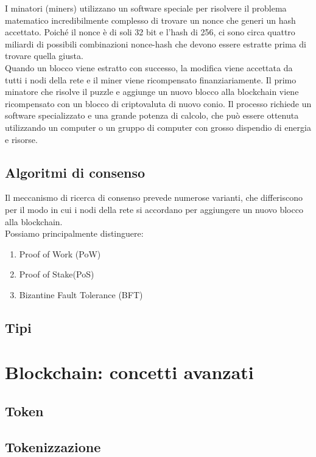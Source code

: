 I minatori (miners) utilizzano un software speciale per risolvere il problema matematico incredibilmente complesso 
di trovare un nonce che generi un hash accettato. Poiché il nonce è di soli 32 bit e l'hash di 256, ci sono circa quattro miliardi 
di possibili combinazioni nonce-hash che devono essere estratte prima di trovare quella giusta. \\

Quando un blocco viene estratto con successo, la modifica viene accettata da tutti i nodi della rete e il miner viene ricompensato finanziariamente. 
Il primo minatore che risolve il puzzle e aggiunge un nuovo blocco alla blockchain viene ricompensato con un blocco di criptovaluta di nuovo conio.
Il processo richiede un software specializzato e una grande potenza di calcolo, che può essere ottenuta utilizzando un computer o un gruppo di computer con grosso dispendio di energia e risorse.

\subsection{Algoritmi di consenso}\label{sec:tecnologie-blockchain-algoritmi}
Il meccanismo di ricerca di consenso prevede numerose varianti, che differiscono per il modo in cui i nodi della rete si accordano per aggiungere un nuovo blocco alla blockchain.\\
Possiamo principalmente distinguere:
\begin{enumerate}
    \item{Proof of Work (PoW)}
    \item{Proof of Stake(PoS)}
    \item{Bizantine Fault Tolerance (BFT)}
\end{enumerate}

\subsection{Tipi}\label{sec:tecnologie-blockchain-tipi}

\section{Blockchain: concetti avanzati}\label{sec:tecnologie-blockchain-avanzate}
\subsection{Token}\label{sec:tecnologie-blockchain-avanzate-token}
\subsection{Tokenizzazione}\label{sec:tecnologie-blockchain-avanziate-tokenizzazione}
